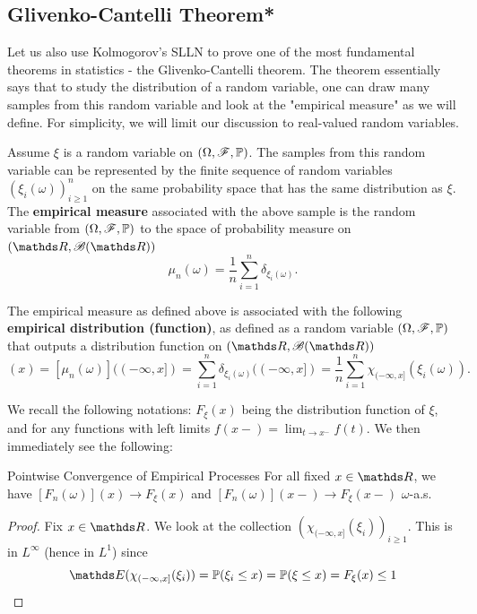 \subsection{Glivenko-Cantelli Theorem*}
\begin{unexaminable}
Let us also use Kolmogorov's SLLN to prove one of the most fundamental theorems in statistics - the Glivenko-Cantelli theorem. The theorem essentially says that to study the distribution of a random variable, one can draw many samples from this random variable and look at the "empirical measure" as we will define. For simplicity, we will limit our discussion to real-valued random variables.

\begin{definition}
Assume $\xi$ is a random variable on $(\Omega, \mathcal{F}, \mathbb{P})$. The samples from this random variable can be represented by the finite sequence of random variables $(\xi_i(\omega))_{i \geq 1}^n$ on the same probability space that has the same distribution as $\xi$. The \textbf{empirical measure} associated with the above sample is the random variable from $(\Omega,\mathcal{F},\mathbb{P})$ to the space of probability measure on $(\R,\B(\R))$
\begin{equation}
\mu_n(\omega) = \frac{1}{n} \sum_{i=1}^n \delta_{\xi_i(\omega)}.
\end{equation}

The empirical measure as defined above is associated with the following \textbf{empirical distribution (function)}, as defined as a random variable $(\Omega,\mathcal{F},\mathbb{P})$ that outputs a distribution function on $(\R,\B(\R))$
\begin{equation}
    [F_n(\omega)](x) = [\mu_n(\omega)]((-\infty,x]) = \sum_{i=1}^n \delta_{\xi_i(\omega)}((-\infty,x]) = \frac{1}{n} \sum_{i=1}^n \chi_{(-\infty, x]}(\xi_i(\omega)).
\end{equation}
\end{definition}

We recall the following notations: $F_\xi(x)$ being the distribution function of $\xi$, and for any functions with left limits $f(x-) = \lim_{t \to x^-} f(t)$. We then immediately see the following:

\begin{lemma}{Pointwise Convergence of Empirical Processes}{}
For all fixed $x\in \R$, we have $[F_n(\omega)](x) \to F_\xi(x)$ and $[F_n(\omega)](x-) \to F_\xi(x-)$ $\omega$-a.s.
\end{lemma}

\begin{proof}
Fix $x \in \R$. We look at the collection $(\chi_{(-\infty,x]}(\xi_i))_{i \geq 1}$. This is in $L^\infty$ (hence in $L^1$) since 
\begin{equation*}
\E(\chi_{(-\infty,x]}(\xi_i)) = \p(\xi_i \leq x) = \p(\xi \leq x) = F_\xi(x) \leq 1
\end{equation*}


\end{proof}
\end{unexaminable}
